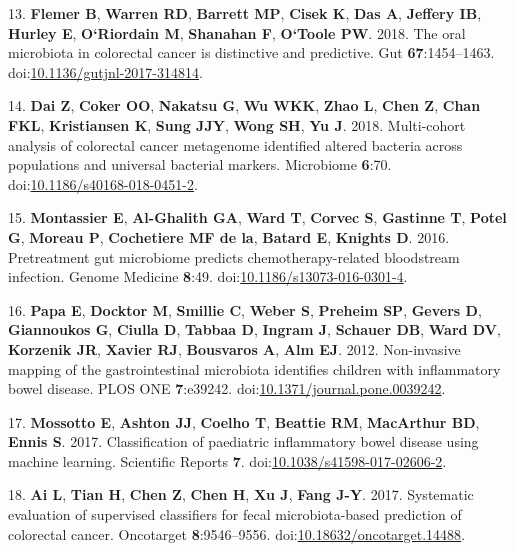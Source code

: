 \documentclass[11pt,]{article}
\begin{document}
\hypertarget{ref-flemer_oral_2018}{}
13. \textbf{Flemer B}, \textbf{Warren RD}, \textbf{Barrett MP},
\textbf{Cisek K}, \textbf{Das A}, \textbf{Jeffery IB}, \textbf{Hurley
E}, \textbf{O`Riordain M}, \textbf{Shanahan F}, \textbf{O`Toole PW}.
2018. The oral microbiota in colorectal cancer is distinctive and
predictive. Gut \textbf{67}:1454--1463.
doi:\href{https://doi.org/10.1136/gutjnl-2017-314814}{10.1136/gutjnl-2017-314814}.

\hypertarget{ref-dai_multi-cohort_2018}{}
14. \textbf{Dai Z}, \textbf{Coker OO}, \textbf{Nakatsu G}, \textbf{Wu
WKK}, \textbf{Zhao L}, \textbf{Chen Z}, \textbf{Chan FKL},
\textbf{Kristiansen K}, \textbf{Sung JJY}, \textbf{Wong SH}, \textbf{Yu
J}. 2018. Multi-cohort analysis of colorectal cancer metagenome
identified altered bacteria across populations and universal bacterial
markers. Microbiome \textbf{6}:70.
doi:\href{https://doi.org/10.1186/s40168-018-0451-2}{10.1186/s40168-018-0451-2}.

\hypertarget{ref-montassier_pretreatment_2016}{}
15. \textbf{Montassier E}, \textbf{Al-Ghalith GA}, \textbf{Ward T},
\textbf{Corvec S}, \textbf{Gastinne T}, \textbf{Potel G}, \textbf{Moreau
P}, \textbf{Cochetiere MF de la}, \textbf{Batard E}, \textbf{Knights D}.
2016. Pretreatment gut microbiome predicts chemotherapy-related
bloodstream infection. Genome Medicine \textbf{8}:49.
doi:\href{https://doi.org/10.1186/s13073-016-0301-4}{10.1186/s13073-016-0301-4}.

\hypertarget{ref-papa_non-invasive_2012}{}
16. \textbf{Papa E}, \textbf{Docktor M}, \textbf{Smillie C},
\textbf{Weber S}, \textbf{Preheim SP}, \textbf{Gevers D},
\textbf{Giannoukos G}, \textbf{Ciulla D}, \textbf{Tabbaa D},
\textbf{Ingram J}, \textbf{Schauer DB}, \textbf{Ward DV},
\textbf{Korzenik JR}, \textbf{Xavier RJ}, \textbf{Bousvaros A},
\textbf{Alm EJ}. 2012. Non-invasive mapping of the gastrointestinal
microbiota identifies children with inflammatory bowel disease. PLOS ONE
\textbf{7}:e39242.
doi:\href{https://doi.org/10.1371/journal.pone.0039242}{10.1371/journal.pone.0039242}.

\hypertarget{ref-mossotto_classification_2017}{}
17. \textbf{Mossotto E}, \textbf{Ashton JJ}, \textbf{Coelho T},
\textbf{Beattie RM}, \textbf{MacArthur BD}, \textbf{Ennis S}. 2017.
Classification of paediatric inflammatory bowel disease using machine
learning. Scientific Reports \textbf{7}.
doi:\href{https://doi.org/10.1038/s41598-017-02606-2}{10.1038/s41598-017-02606-2}.

\hypertarget{ref-ai_systematic_2017}{}
18. \textbf{Ai L}, \textbf{Tian H}, \textbf{Chen Z}, \textbf{Chen H},
\textbf{Xu J}, \textbf{Fang J-Y}. 2017. Systematic evaluation of
supervised classifiers for fecal microbiota-based prediction of
colorectal cancer. Oncotarget \textbf{8}:9546--9556.
doi:\href{https://doi.org/10.18632/oncotarget.14488}{10.18632/oncotarget.14488}.
\end{document}
